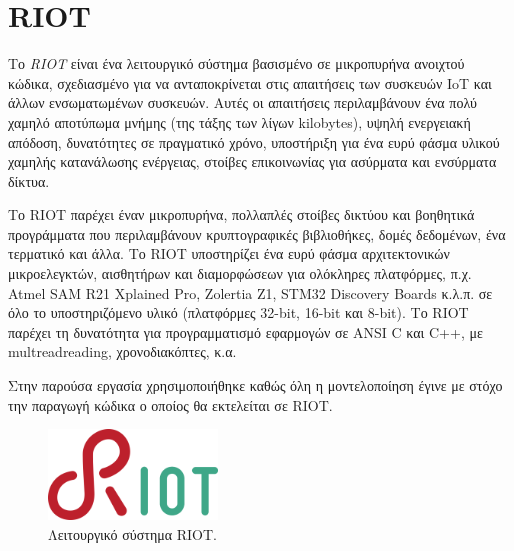 \section{RIOT}
\label{sec:riot}

Το \textit{RIOT} \cite{bib:riot} είναι ένα λειτουργικό σύστημα βασισμένο σε μικροπυρήνα ανοιχτού κώδικα, σχεδιασμένο για να ανταποκρίνεται στις απαιτήσεις των συσκευών IoT και άλλων ενσωματωμένων συσκευών. Αυτές οι απαιτήσεις περιλαμβάνουν ένα πολύ χαμηλό αποτύπωμα μνήμης (της τάξης των λίγων kilobytes), υψηλή ενεργειακή απόδοση, δυνατότητες σε πραγματικό χρόνο, υποστήριξη για ένα ευρύ φάσμα υλικού χαμηλής κατανάλωσης ενέργειας, στοίβες επικοινωνίας για ασύρματα και ενσύρματα δίκτυα.

Το RIOT παρέχει έναν μικροπυρήνα, πολλαπλές στοίβες δικτύου και βοηθητικά προγράμματα που περιλαμβάνουν κρυπτογραφικές βιβλιοθήκες, δομές δεδομένων, ένα τερματικό και άλλα. Το RIOT υποστηρίζει ένα ευρύ φάσμα αρχιτεκτονικών μικροελεγκτών, αισθητήρων και διαμορφώσεων για ολόκληρες πλατφόρμες, π.χ. Atmel SAM R21 Xplained Pro, Zolertia Z1, STM32 Discovery Boards κ.λ.π. σε όλο το υποστηριζόμενο υλικό (πλατφόρμες 32-bit, 16-bit και 8-bit). Το RIOT παρέχει τη δυνατότητα για προγραμματισμό εφαρμογών σε ANSI C και C++, με multreadreading, χρονοδιακόπτες, κ.α.

Στην παρούσα εργασία χρησιμοποιήθηκε καθώς όλη η μοντελοποίηση έγινε με στόχο την παραγωγή κώδικα ο οποίος θα εκτελείται σε RIOT.

\begin{figure}[!ht]
  \centering
  \includegraphics[width=0.4\textwidth]{./images/chapter4/riot.png}
  \caption[Λειτουργικό σύστημα RIOT.]{Λειτουργικό σύστημα RIOT.\footnotemark}
  \label{fig:riot}
\end{figure}

